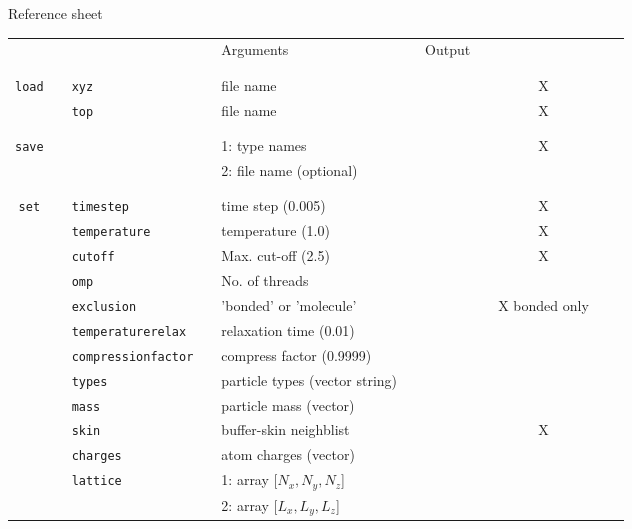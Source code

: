 \documentclass[11pt]{article}
\begin{document}
\begin{center}

  {\huge{Reference sheet}}
  
  \bigskip

  \bigskip
  
  \begin{tabular}{cclclcccccc}
	  {\color{red}{\textbf{Action}}} && {\color{blue}{Specifier}} && Arguments && Output && \rotatebox{90}{CUDA}\\
		&& && && && && \\
    \hline
		&& && && && \\
	  \verb!load! && \verb!xyz! && file name &&  && X \\
	  $\mbox{}$ && \verb!top! && file name &&  && X \\
								   && && &&  && && \\
    \hline
	  && && && && && \\
	  \verb!save! &&  && 1: type names && && X \\
				&&  && 2: file name (optional)&&  && \\
				&& && && && \\
    \hline
	  && && && && \\
	  \verb!set! && \verb!timestep! && time step (0.005) && && X \\
	  $\mbox{}$  && \verb!temperature! && temperature (1.0) && && X\\
	  $\mbox{}$  && \verb!cutoff! && Max. cut-off (2.5) && && X \\
	  $\mbox{}$  && \verb!omp! && No. of threads && && \\
	  $\mbox{}$ && \verb!exclusion! && 'bonded' or 'molecule' && && X  bonded only\\
	  $\mbox{}$ && \verb!temperaturerelax! && relaxation time (0.01) && && \\
	  $\mbox{}$ && \verb!compressionfactor! && compress factor (0.9999) && && \\
	  $\mbox{}$ && \verb!types! && particle types (vector string) && && \\
	  $\mbox{}$ && \verb!mass! && particle mass (vector) && && \\
	  $\mbox{}$ && \verb!skin! && buffer-skin neighblist && && X \\
	  $\mbox{}$ && \verb!charges! && atom charges (vector) && && \\
	  $\mbox{}$ && \verb!lattice! && 1: array [$N_x , N_y , N_z$] && && \\
	  $\mbox{}$ && $\mbox{}$      && 2: array [$L_x, L_y, L_z$] && && \\

\end{tabular}
\end{center}
\end{document}
